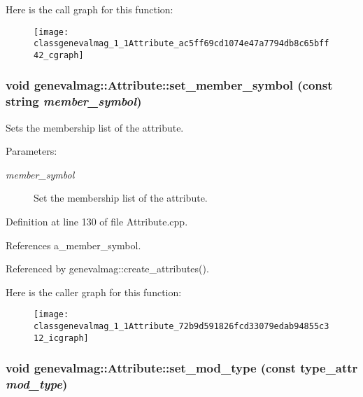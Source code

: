 Here is the call graph for this function:\nopagebreak
\begin{figure}[H]
\begin{center}
\leavevmode
\texttt{[image: classgenevalmag\_1\_1Attribute\_ac5ff69cd1074e47a7794db8c65bff42\_cgraph]}
\end{center}
\end{figure}
\hypertarget{classgenevalmag_1_1Attribute_72b9d591826fcd33079edab94855c312}{
\subsubsection[{set\_\-member\_\-symbol}]{\setlength{\rightskip}{0pt plus 5cm}void genevalmag::Attribute::set\_\-member\_\-symbol (const string {\em member\_\-symbol})}}
\label{classgenevalmag_1_1Attribute_72b9d591826fcd33079edab94855c312}


Sets the membership list of the attribute. \begin{Desc}
\item[Parameters:]
\begin{description}
\item[{\em member\_\-symbol}]Set the membership list of the attribute. \end{description}
\end{Desc}


Definition at line 130 of file Attribute.cpp.

References a\_\-member\_\-symbol.

Referenced by genevalmag::create\_\-attributes().

Here is the caller graph for this function:\nopagebreak
\begin{figure}[H]
\begin{center}
\leavevmode
\texttt{[image: classgenevalmag\_1\_1Attribute\_72b9d591826fcd33079edab94855c312\_icgraph]}
\end{center}
\end{figure}
\hypertarget{classgenevalmag_1_1Attribute_5145c88f9e2e6e797996e6a31a2492fb}{
\subsubsection[{set\_\-mod\_\-type}]{\setlength{\rightskip}{0pt plus 5cm}void genevalmag::Attribute::set\_\-mod\_\-type (const {\bf type\_\-attr} {\em mod\_\-type})}}
\label{classgenevalmag_1_1Attribute_5145c88f9e2e6e797996e6a31a2492fb}


